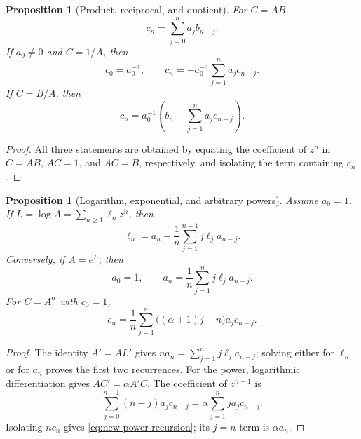 \documentclass[11pt,a4paper,oneside,openany]{book}
\newtheorem{proposition}[theorem]{Proposition}
\theoremstyle{definition}
\theoremstyle{remark}
\begin{document}
\begin{proposition}[Product, reciprocal, and quotient]\label{prop:new-basic-algorithms}
For $C=AB$,
\begin{equation}\label{eq:new-product-recursion}
 c_n=\sum_{j=0}^na_jb_{n-j}.
\end{equation}
If $a_0\ne0$ and $C=1/A$, then
\begin{equation}\label{eq:new-reciprocal-recursion}
 c_0=a_0^{-1},\qquad
 c_n=-a_0^{-1}\sum_{j=1}^na_jc_{n-j}.
\end{equation}
If $C=B/A$, then
\begin{equation}\label{eq:new-quotient-recursion}
 c_n=a_0^{-1}\left(b_n-\sum_{j=1}^na_jc_{n-j}\right).
\end{equation}
\end{proposition}

\begin{proof}
All three statements are obtained by equating the coefficient of $z^n$ in
$C=AB$, $AC=1$, and $AC=B$, respectively, and isolating the term containing
$c_n$.
\end{proof}

\begin{proposition}[Logarithm, exponential, and arbitrary powers]\label{prop:new-log-exp-power}
Assume $a_0=1$.  If $L=\log A=\sum_{n\ge1}\ell_nz^n$, then
\begin{equation}\label{eq:new-log-recursion}
 \ell_n=a_n-\frac1n\sum_{j=1}^{n-1}j\ell_j a_{n-j}.
\end{equation}
Conversely, if $A=e^L$, then
\begin{equation}\label{eq:new-exp-recursion}
 a_0=1,\qquad a_n=\frac1n\sum_{j=1}^n j\ell_j a_{n-j}.
\end{equation}
For $C=A^\alpha$ with $c_0=1$,
\begin{equation}\label{eq:new-power-recursion}
 c_n=\frac1n\sum_{j=1}^n\bigl((\alpha+1)j-n\bigr)a_jc_{n-j}.
\end{equation}
\end{proposition}

\begin{proof}
The identity $A'=AL'$ gives
$n a_n=\sum_{j=1}^n j\ell_j a_{n-j}$; solving either for $\ell_n$ or for
$a_n$ proves the first two recurrences.  For the power, logarithmic
differentiation gives $AC'=\alpha A'C$.  The coefficient of $z^{n-1}$ is
\[
 \sum_{j=0}^{n-1}(n-j)a_jc_{n-j}
 =\alpha\sum_{j=1}^n j a_jc_{n-j}.
\]
Isolating $nc_n$ gives \eqref{eq:new-power-recursion}; its $j=n$ term is
$\alpha a_n$.
\end{proof}
\end{document}

